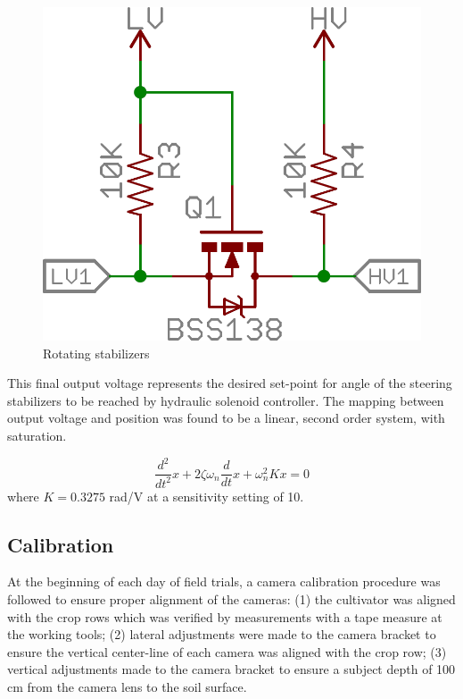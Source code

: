 \documentclass[authoryear]{elsarticle}
\begin{document}
\begin{figure}
  \centering
  \includegraphics[scale=0.3,natwidth=610,natheight=642]{signal_conditioning.png}
  \caption{Rotating stabilizers}
  \label{fig:signal_conditioning}
\end{figure}

This final output voltage represents the desired set-point for angle
of the steering stabilizers to be reached by hydraulic solenoid
controller. The mapping between output voltage and position was found
to be a linear, second order system, with saturation.

\begin{equation}
  \frac{d^2}{dt^2}x + 2\zeta\omega_{n}\frac{d}{dt}x + \omega_{n}^2 Kx = 0 
  \label{eq:v_out}
\end{equation}
where $K=0.3275$ rad/V at a sensitivity setting of 10.

\subsection{Calibration}
At the beginning of each day of field trials, a camera calibration
procedure was followed to ensure proper alignment of the cameras: (1)
the cultivator was aligned with the crop rows which was verified by
measurements with a tape measure at the working tools; (2) lateral
adjustments were made to the camera bracket to ensure the vertical
center-line of each camera was aligned with the crop row; (3) vertical
adjustments made to the camera bracket to ensure a subject depth of
100 cm from the camera lens to the soil surface.
\end{document}
